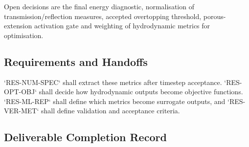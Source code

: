 
Open decisions are the final energy diagnostic, normalisation of
transmission/reflection measures, accepted overtopping threshold,
porous-extension activation gate and weighting of hydrodynamic metrics
for optimisation.

\subsection{Requirements and Handoffs}
\label{sec:res-phy-bar-requirements}


`RES-NUM-SPEC` shall extract these metrics after timestep acceptance.
`RES-OPT-OBJ` shall decide how hydrodynamic outputs become objective
functions. `RES-ML-REP` shall define which metrics become surrogate
outputs, and `RES-VER-MET` shall define validation and acceptance
criteria.

\subsection{Deliverable Completion Record}
\label{sec:res-phy-bar-completion-record}

%
%
%
